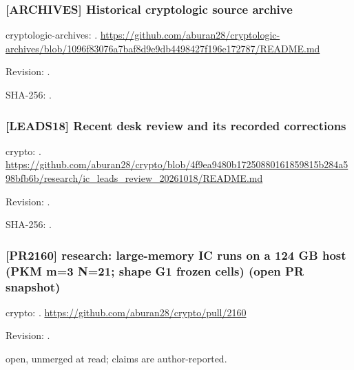 \par\noindent\begin{minipage}{\linewidth}\small
\subsubsection*{[ARCHIVES] Historical cryptologic source archive}\label{art:ARCHIVES}
cryptologic-archives: .
\url{https://github.com/aburan28/cryptologic-archives/blob/1096f83076a7baf8d9e9db4498427f196e172787/README.md}
\par Revision: .
\par SHA-256: .
\end{minipage}\par\medskip

\par\noindent\begin{minipage}{\linewidth}\small
\subsubsection*{[LEADS18] Recent desk review and its recorded corrections}\label{art:LEADS18}
crypto: .
\url{https://github.com/aburan28/crypto/blob/4f9ea9480b17250880161859815b284a598bfb6b/research/ic_leads_review_20261018/README.md}
\par Revision: .
\par SHA-256: .
\end{minipage}\par\medskip

\par\noindent\begin{minipage}{\linewidth}\small
\subsubsection*{[PR2160] research: large-memory IC runs on a 124 GB host (PKM m=3 N=21; shape G1 frozen cells) (open PR snapshot)}\label{art:PR2160}
crypto: .
\url{https://github.com/aburan28/crypto/pull/2160}
\par Revision: .
\par open, unmerged at read; claims are author-reported.
\end{minipage}\par\medskip

